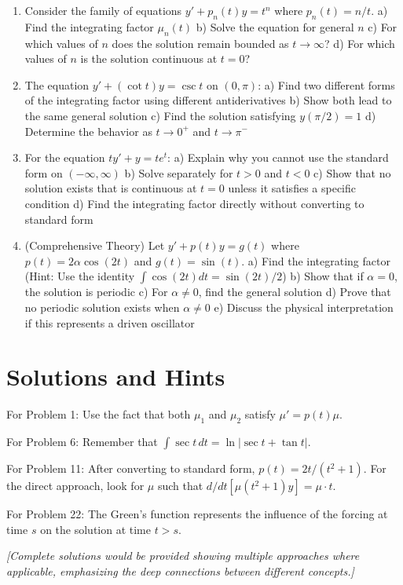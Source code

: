 \documentclass[12pt]{article}
\begin{document}
\begin{enumerate}[resume]
\item Consider the family of equations $y' + p_n(t)y = t^n$ where $p_n(t) = n/t$.
   a) Find the integrating factor $\mu_n(t)$
   b) Solve the equation for general $n$
   c) For which values of $n$ does the solution remain bounded as $t \to \infty$?
   d) For which values of $n$ is the solution continuous at $t = 0$?

\item The equation $y' + (\cot t)y = \csc t$ on $(0, \pi)$:
   a) Find two different forms of the integrating factor using different antiderivatives
   b) Show both lead to the same general solution
   c) Find the solution satisfying $y(\pi/2) = 1$
   d) Determine the behavior as $t \to 0^+$ and $t \to \pi^-$

\item For the equation $ty' + y = te^t$:
   a) Explain why you cannot use the standard form on $(-\infty, \infty)$
   b) Solve separately for $t > 0$ and $t < 0$
   c) Show that no solution exists that is continuous at $t = 0$ unless it satisfies a specific condition
   d) Find the integrating factor directly without converting to standard form

\item (Comprehensive Theory) Let $y' + p(t)y = g(t)$ where $p(t) = 2\alpha\cos(2t)$ and $g(t) = \sin(t)$.
   a) Find the integrating factor (Hint: Use the identity $\int \cos(2t)dt = \sin(2t)/2$)
   b) Show that if $\alpha = 0$, the solution is periodic
   c) For $\alpha \neq 0$, find the general solution
   d) Prove that no periodic solution exists when $\alpha \neq 0$
   e) Discuss the physical interpretation if this represents a driven oscillator
\end{enumerate}

\section*{Solutions and Hints}

\begin{hint}
For Problem 1: Use the fact that both $\mu_1$ and $\mu_2$ satisfy $\mu' = p(t)\mu$.
\end{hint}

\begin{hint}
For Problem 6: Remember that $\int \sec t \, dt = \ln|\sec t + \tan t|$.
\end{hint}

\begin{hint}
For Problem 11: After converting to standard form, $p(t) = 2t/(t^2+1)$. For the direct approach, look for $\mu$ such that $d/dt[\mu(t^2+1)y] = \mu \cdot t$.
\end{hint}

\begin{hint}
For Problem 22: The Green's function represents the influence of the forcing at time $s$ on the solution at time $t > s$.
\end{hint}

\textit{[Complete solutions would be provided showing multiple approaches where applicable, emphasizing the deep connections between different concepts.]}
\end{document}

